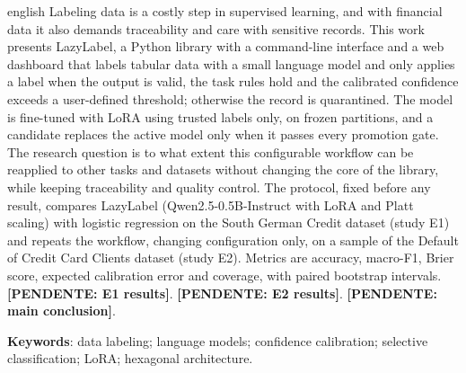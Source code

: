 \documentclass[12pt,oneside,a4paper,chapter=TITLE,section=TITLE,english,brazil]{abntex2}
\newcommand{\pendente}[1]{\textbf{[PENDENTE: #1]}}
\newcommand{\listofquadrosname}{Lista de quadros}
\begin{document}
\begin{resumo}[Abstract]
\begin{otherlanguage*}{english}
Labeling data is a costly step in supervised learning, and with financial data it also demands traceability and care with sensitive records. This work presents LazyLabel, a Python library with a command-line interface and a web dashboard that labels tabular data with a small language model and only applies a label when the output is valid, the task rules hold and the calibrated confidence exceeds a user-defined threshold; otherwise the record is quarantined. The model is fine-tuned with LoRA using trusted labels only, on frozen partitions, and a candidate replaces the active model only when it passes every promotion gate. The research question is to what extent this configurable workflow can be reapplied to other tasks and datasets without changing the core of the library, while keeping traceability and quality control. The protocol, fixed before any result, compares LazyLabel (Qwen2.5-0.5B-Instruct with LoRA and Platt scaling) with logistic regression on the South German Credit dataset (study E1) and repeats the workflow, changing configuration only, on a sample of the Default of Credit Card Clients dataset (study E2). Metrics are accuracy, macro-F1, Brier score, expected calibration error and coverage, with paired bootstrap intervals. \pendente{E1 results}. \pendente{E2 results}. \pendente{main conclusion}.

\vspace{\onelineskip}
\noindent
\textbf{Keywords}: data labeling; language models; confidence calibration; selective classification; LoRA; hexagonal architecture.
\end{otherlanguage*}
\end{resumo}

\listoffigures*
\cleardoublepage

\pdfbookmark[0]{\listofquadrosname}{loq}
\listofquadros*
\cleardoublepage

\listoftables*
\cleardoublepage
\end{document}
